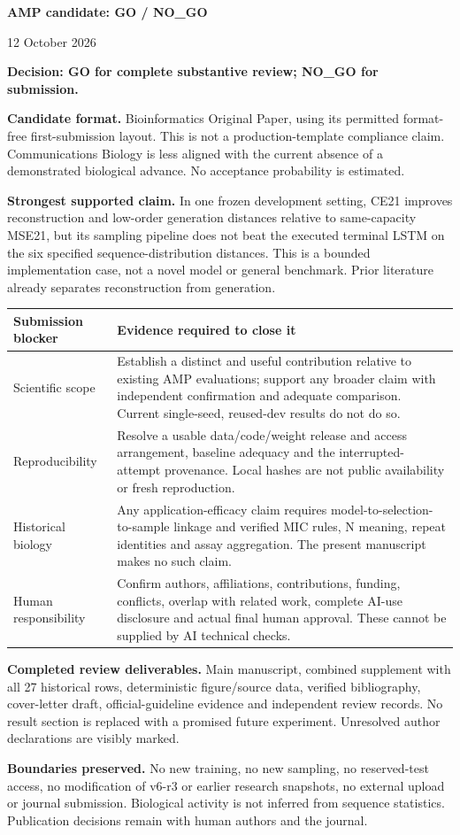 \documentclass[11pt,a4paper]{article}
\begin{document}
\begin{center}\Large\textbf{AMP candidate: GO / NO\_GO}\par\normalsize 12 October 2026\end{center}
\noindent\textbf{Decision: GO for complete substantive review; NO\_GO for submission.}

\noindent\textbf{Candidate format.} Bioinformatics Original Paper, using its permitted format-free first-submission layout. This is not a production-template compliance claim. Communications Biology is less aligned with the current absence of a demonstrated biological advance. No acceptance probability is estimated.

\noindent\textbf{Strongest supported claim.} In one frozen development setting, CE21 improves reconstruction and low-order generation distances relative to same-capacity MSE21, but its sampling pipeline does not beat the executed terminal LSTM on the six specified sequence-distribution distances. This is a bounded implementation case, not a novel model or general benchmark. Prior literature already separates reconstruction from generation.

\begin{tabular}{@{}p{.23\linewidth}p{.70\linewidth}@{}}\toprule
Submission blocker & Evidence required to close it\\\midrule
Scientific scope & Establish a distinct and useful contribution relative to existing AMP evaluations; support any broader claim with independent confirmation and adequate comparison. Current single-seed, reused-dev results do not do so.\\[5pt]
Reproducibility & Resolve a usable data/code/weight release and access arrangement, baseline adequacy and the interrupted-attempt provenance. Local hashes are not public availability or fresh reproduction.\\[5pt]
Historical biology & Any application-efficacy claim requires model-to-selection-to-sample linkage and verified MIC rules, N meaning, repeat identities and assay aggregation. The present manuscript makes no such claim.\\[5pt]
Human responsibility & Confirm authors, affiliations, contributions, funding, conflicts, overlap with related work, complete AI-use disclosure and actual final human approval. These cannot be supplied by AI technical checks.\\\bottomrule
\end{tabular}

\noindent\textbf{Completed review deliverables.} Main manuscript, combined supplement with all 27 historical rows, deterministic figure/source data, verified bibliography, cover-letter draft, official-guideline evidence and independent review records. No result section is replaced with a promised future experiment. Unresolved author declarations are visibly marked.

\noindent\textbf{Boundaries preserved.} No new training, no new sampling, no reserved-test access, no modification of v6-r3 or earlier research snapshots, no external upload or journal submission. Biological activity is not inferred from sequence statistics. Publication decisions remain with human authors and the journal.
\end{document}
